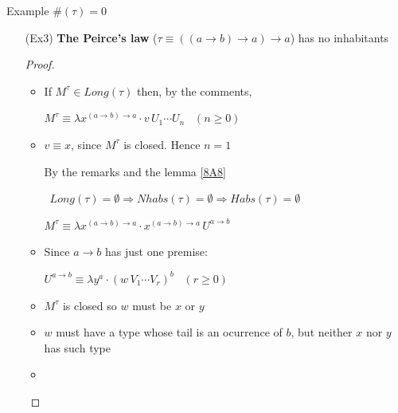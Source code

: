 \begin{frame}{Example $\#(\tau) = 0$}
\begin{itemize}
  \item[(Ex3)] \textbf{The Peirce's law} ($\tau \equiv ((a \to b) \to a) \to a$) has no inhabitants
 \begin{proof}
  \begin{itemize}
   \item If $M^{\tau} \in Long(\tau)$ then, by the comments, 
   \begin{center}
       $M^{\tau} \equiv \lambda x^{(a\to b) \to a} \cdot v\,U_1\cdots U_n\,\,\,\,\,(n \geq 0)$
   \end{center}
   \item $v \equiv x$, since $M^{\tau}$ is closed. Hence $n = 1$
   \begin{center}By the remarks and the lemma \ref{8A8} 
    \begin{center}\
    $Long(\tau) = \emptyset \Rightarrow Nhabs(\tau) = \emptyset \Rightarrow Habs(\tau) = \emptyset$
    \end{center}
       $M^{\tau} \equiv \lambda x^{(a\to b) \to a} \cdot x^{(a\to b) \to a}\,U^{a\to b}$ 
   \end{center}
    \item Since $a\to b$ has just one premise:
   \begin{center}
    $U^{a\to b} \equiv \lambda y^a \cdot (w\,V_1\cdots V_r)^b\,\,\,\,\, (r \geq 0)$
   \end{center}
    \item $M^{\tau}$ is closed so $w$ must be $x$ or $y$
    \item $w$ must have a type whose tail is an ocurrence of $b$, but neither $x$ nor $y$ has such type
    \item 
  \end{itemize}
 \end{proof}
\end{itemize}
\end{frame}

